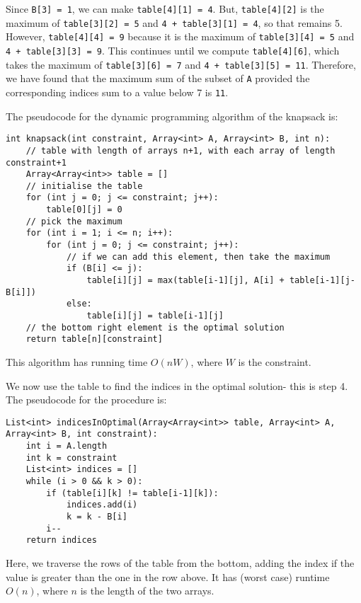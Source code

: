 \documentclass[a4paper, openany]{memoir}
\begin{document}
Since \texttt{B[3] = 1}, we can make \texttt{table[4][1] = 4}. But, \texttt{table[4][2]} is the maximum of \texttt{table[3][2] = 5} and \texttt{4 + table[3][1] = 4}, so that remains 5. However, \texttt{table[4][4] = 9} because it is the maximum of \texttt{table[3][4] = 5} and \texttt{4 + table[3][3] = 9}. This continues until we compute \texttt{table[4][6]}, which takes the maximum of \texttt{table[3][6] = 7} and \texttt{4 + table[3][5] = 11}. Therefore, we have found that the maximum sum of the subset of \texttt{A} provided the corresponding indices sum to a value below 7 is \texttt{11}. 

\noindent The pseudocode for the dynamic programming algorithm of the knapsack is:
\begin{lstlisting}[language=pseudocode]
int knapsack(int constraint, Array<int> A, Array<int> B, int n):
    // table with length of arrays n+1, with each array of length constraint+1
    Array<Array<int>> table = []
    // initialise the table
    for (int j = 0; j <= constraint; j++):
        table[0][j] = 0
    // pick the maximum
    for (int i = 1; i <= n; i++):
        for (int j = 0; j <= constraint; j++):
            // if we can add this element, then take the maximum
            if (B[i] <= j):
                table[i][j] = max(table[i-1][j], A[i] + table[i-1][j-B[i]])
            else:
                table[i][j] = table[i-1][j]
    // the bottom right element is the optimal solution
    return table[n][constraint]
\end{lstlisting}
This algorithm has running time $O(nW)$, where $W$ is the constraint.

\noindent We now use the table to find the indices in the optimal solution- this is step 4. The pseudocode for the procedure is:
\begin{lstlisting}[language=pseudocode]
List<int> indicesInOptimal(Array<Array<int>> table, Array<int> A, Array<int> B, int constraint):
    int i = A.length
    int k = constraint
    List<int> indices = []
    while (i > 0 && k > 0):
        if (table[i][k] != table[i-1][k]):
            indices.add(i)
            k = k - B[i]
        i--
    return indices
\end{lstlisting}
Here, we traverse the rows of the table from the bottom, adding the index if the value is greater than the one in the row above. It has (worst case) runtime $O(n)$, where $n$ is the length of the two arrays.
\end{document}
